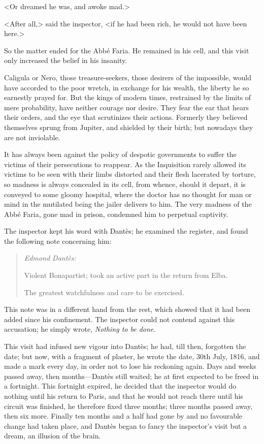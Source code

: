  <Or dreamed he was, and awoke mad.> 

 <After all,> said the inspector, <if he had been rich, he would not have been here.> 

 So the matter ended for the Abbé Faria. He remained in his cell, and this visit only increased the belief in his insanity. 

 Caligula or Nero, those treasure-seekers, those desirers of the impossible, would have accorded to the poor wretch, in exchange for his wealth, the liberty he so earnestly prayed for. But the kings of modern times, restrained by the limits of mere probability, have neither courage nor desire. They fear the ear that hears their orders, and the eye that scrutinizes their actions. Formerly they believed themselves sprung from Jupiter, and shielded by their birth; but nowadays they are not inviolable. 

 It has always been against the policy of despotic governments to suffer the victims of their persecutions to reappear. As the Inquisition rarely allowed its victims to be seen with their limbs distorted and their flesh lacerated by torture, so madness is always concealed in its cell, from whence, should it depart, it is conveyed to some gloomy hospital, where the doctor has no thought for man or mind in the mutilated being the jailer delivers to him. The very madness of the Abbé Faria, gone mad in prison, condemned him to perpetual captivity.  
 
 The inspector kept his word with Dantès; he examined the register, and found the following note concerning him: 
\begin{quotation}
 \textit{Edmond Dantès:}

 Violent Bonapartist; took an active part in the return from Elba. 

 The greatest watchfulness and care to be exercised. 
\end{quotation}

 This note was in a different hand from the rest, which showed that it had been added since his confinement. The inspector could not contend against this accusation; he simply wrote, \textit{Nothing to be done.}

 This visit had infused new vigour into Dantès; he had, till then, forgotten the date; but now, with a fragment of plaster, he wrote the date, 30th July, 1816, and made a mark every day, in order not to lose his reckoning again. Days and weeks passed away, then months—Dantès still waited; he at first expected to be freed in a fortnight. This fortnight expired, he decided that the inspector would do nothing until his return to Paris, and that he would not reach there until his circuit was finished, he therefore fixed three months; three months passed away, then six more. Finally ten months and a half had gone by and no favourable change had taken place, and Dantès began to fancy the inspector's visit but a dream, an illusion of the brain. 

